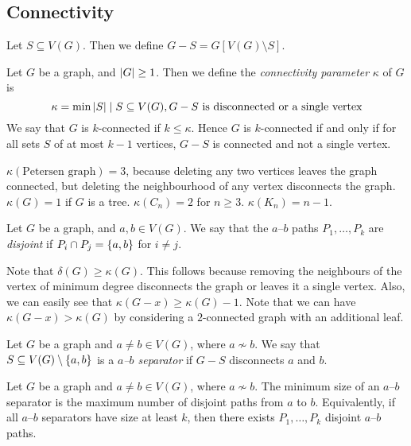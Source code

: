 \subsection{Connectivity}
Let \( S \subseteq V(G) \).
Then we define \( G - S = G[V(G) \setminus S] \).
\begin{definition}
	Let \( G \) be a graph, and \( \abs{G} \geq 1 \).
	Then we define the \emph{connectivity parameter} \( \kappa \) of \( G \) is
	\[ \kappa = \min{\abs{S} \mid S \subseteq V(G), G - S \text{ is disconnected or a single vertex}} \]
	We say that \( G \) is \( k \)-connected if \( k \leq \kappa \).
	Hence \( G \) is \( k \)-connected if and only if for all sets \( S \) of at most \( k-1 \) vertices, \( G - S \) is connected and not a single vertex.
\end{definition}
\begin{example}
	\( \kappa(\text{Petersen graph}) = 3 \), because deleting any two vertices leaves the graph connected, but deleting the neighbourhood of any vertex disconnects the graph.
	\( \kappa(G) = 1 \) if \( G \) is a tree.
	\( \kappa(C_n) = 2 \) for \( n \geq 3 \).
	\( \kappa(K_n) = n - 1 \).
\end{example}
\begin{definition}
	Let \( G \) be a graph, and \( a, b \in V(G) \).
	We say that the \( a \)--\( b \) paths \( P_1, \dots, P_k \) are \emph{disjoint} if \( P_i \cap P_j = \qty{a, b} \) for \( i \neq j \).
\end{definition}
Note that \( \delta(G) \geq \kappa(G) \).
This follows because removing the neighbours of the vertex of minimum degree disconnects the graph or leaves it a single vertex.
Also, we can easily see that \( \kappa(G - x) \geq \kappa(G) - 1 \).
Note that we can have \( \kappa(G-x) > \kappa(G) \) by considering a \( 2 \)-connected graph with an additional leaf.
\begin{definition}
	Let \( G \) be a graph and \( a \neq b \in V(G) \), where \( a \not\sim b \).
	We say that \( S \subseteq V(G) \setminus \qty{a,b} \) is a \emph{\( a \)--\( b \) separator} if \( G - S \) disconnects \( a \) and \( b \).
\end{definition}
\begin{theorem}
	Let \( G \) be a graph and \( a \neq b \in V(G) \), where \( a \not\sim b \).
	The minimum size of an \( a \)--\( b \) separator is the maximum number of disjoint paths from \( a \) to \( b \).
	Equivalently, if all \( a \)--\( b \) separators have size at least \( k \), then there exists \( P_1, \dots, P_k \) disjoint \( a \)--\( b \) paths.
\end{theorem}
